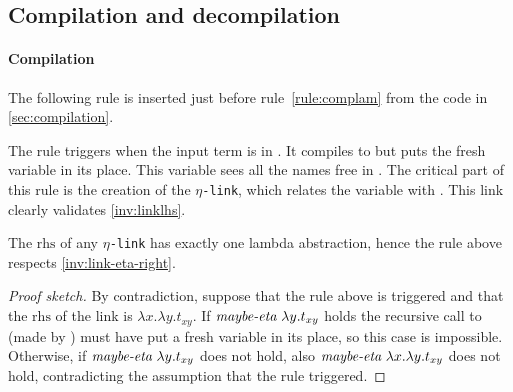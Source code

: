 \documentclass[sigconf,natbib=false,review]{acmart}
\newcommand{\appsep}{\ensuremath{\textcolor{lightgray}{\cdot}}}
\newcommand{\linkMacro}[1]{\ensuremath{#1}\texttt{-link}\xspace}
\newcommand{\linketa} {\linkMacro{\eta}}
\newcommand{\Ho}{\ensuremath{\mathcal{H}_o}\xspace}
\newcommand{\rhs}{\ensuremath{\mathrm{rhs}}\xspace}
\begin{document}

% 


\subsection{Compilation and decompilation}\label{sec:etacomp}


\paragraph{Compilation}
The following rule is inserted just before rule~\ref{rule:complam} from the code in
\cref{sec:compilation}.



\noindent
The rule triggers when the input term  is in
\maybeeta. It compiles  to  but puts the fresh
variable  in its place. This variable sees all the names free in
. The critical part of this rule is the creation of the \linketa,
which relates the variable  with .
This link clearly validates \cref{inv:linklhs}.

\begin{corollary}
  The \rhs of any \linketa has exactly one lambda abstraction, hence
  the rule above respects \cref{inv:link-eta-right}.
  \label{cor:rhs-eta-onelamb}
\end{corollary}

\begin{proof}[Proof sketch]
  By contradiction, suppose that the rule above is triggered and that
  the \rhs of the link is $\lambda x.\lambda y.t_{xy}$.
  If $\emph{maybe-eta}{}~\lambda y.t_{xy}$ holds the recursive call to
   (made by ) must have put a fresh variable
  in its place, so this case is impossible.
  Otherwise, if $\emph{maybe-eta}{}~\lambda y.t_{xy}$ does not hold, also
  $\emph{maybe-eta}{}~\lambda x.\lambda y.t_{xy}$ does not hold, contradicting
  the assumption that the rule triggered.
\end{proof}
\end{document}
